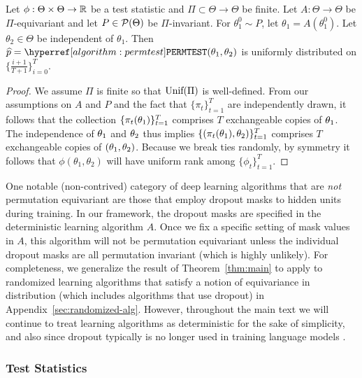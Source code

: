 \begin{theorem}\label{thm:main}
    Let $\phi: \Theta \times \Theta \to \mathbb{R}$ be a test statistic and $\Pi \subset \Theta \to \Theta$ be finite. 
    Let $A : \Theta \to \Theta$ be $\Pi$-equivariant and let $P \in \mathcal{P}(\Theta)$ be $\Pi$-invariant. For $\theta_1^0 \sim P$, let $\theta_1 = A(\theta_1^0)$. Let $\theta_2 \in \Theta$ be independent of $\theta_1$. 
    Then $\est{p} = \permtest(\firstparam,\secondparam)$ is uniformly distributed on $\{\frac{i+1}{T+1}\}_{i=0}^T$.
\end{theorem}
\begin{proof}
    We assume $\Pi$ is finite so that $\textup{Unif}(\Pi)$ is well-defined.
    From our assumptions on $A$ and $P$ and the fact that $\{\pi_t\}_{t=1}^T$ are independently drawn, it follows that the collection $\{\pi_t(\theta_1)\}_{t=1}^T$ comprises $T$ exchangeable copies of $\theta_1$.
    The independence of $\theta_1$ and $\theta_2$ thus implies $\{(\pi_t(\theta_1),\theta_2)\}_{t=1}^T$ comprises $T$ exchangeable copies of $(\theta_1,\theta_2)$. Because we break ties randomly, by symmetry it follows that $\phi(\theta_1, \theta_2)$ will have uniform rank among $\{\phi_t\}_{t=1}^T$.
\end{proof}

One notable (non-contrived) category of deep learning algorithms that are \textit{not} permutation equivariant are those that employ 
dropout masks to hidden units during training. In our framework, the dropout masks are specified in the deterministic learning algorithm $A$. Once we fix a specific setting of mask values in $A$, this algorithm will not be permutation equivariant unless the individual dropout masks are all permutation invariant (which is highly unlikely).
For completeness, we generalize the result of Theorem~\ref{thm:main} to apply to randomized learning algorithms that satisfy a notion of equivariance in distribution (which includes algorithms that use dropout) in Appendix~\ref{sec:randomized-alg}.
However, throughout the main text we will continue to treat learning algorithms as deterministic for the sake of simplicity, and also since dropout typically is no longer used in training language models \citep{chowdhery2022palmscalinglanguagemodeling}.

\subsubsection{Test Statistics}
\label{sec:test-stats}

